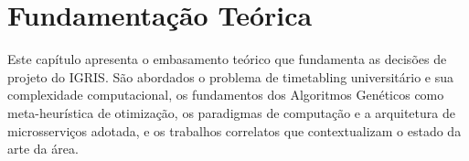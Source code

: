 \chapter{Fundamentação Teórica}
\label{cap:fundamentacao}

Este capítulo apresenta o embasamento teórico que fundamenta as decisões de projeto do IGRIS. São abordados o problema de timetabling universitário e sua complexidade computacional, os fundamentos dos Algoritmos Genéticos como meta-heurística de otimização, os paradigmas de computação e a arquitetura de microsserviços adotada, e os trabalhos correlatos que contextualizam o estado da arte da área.






